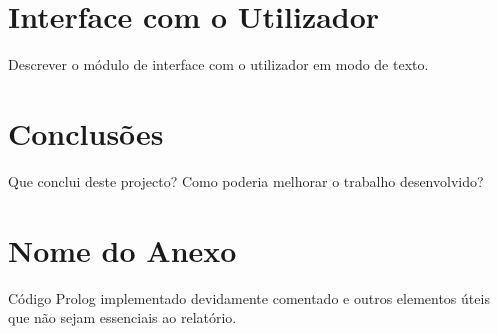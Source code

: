 \documentclass[a4paper]{article}
\begin{document}
\newpage

\section{Interface com o Utilizador}

Descrever o módulo de interface com o utilizador em modo de texto.

\newpage

\section{Conclusões}
Que conclui deste projecto? Como poderia melhorar o trabalho desenvolvido?


\clearpage
{}
\renewcommand\refname{Bibliografia}




\newpage
\appendix
\section{Nome do Anexo}
Código Prolog implementado devidamente comentado e outros elementos úteis que não sejam essenciais ao relatório.
\end{document}

